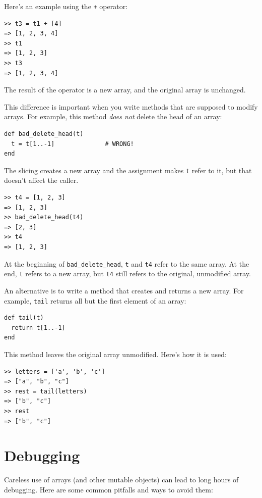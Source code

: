 \documentclass[10pt]{book}
\begin{document}
Here's an example using the {\tt +} operator:
%
\begin{verbatim}
>> t3 = t1 + [4]
=> [1, 2, 3, 4]
>> t1
=> [1, 2, 3]
>> t3
=> [1, 2, 3, 4]
\end{verbatim}
%
The result of the operator is a new array, and the original array is
unchanged.

This difference is important when you write methods that
are supposed to modify arrays.  For example, this method
{\em does not} delete the head of an array:
%
\begin{verbatim}
def bad_delete_head(t)
  t = t[1..-1]              # WRONG!
end
\end{verbatim}
%
The slicing creates a new array and the assignment
makes {\tt t} refer to it, but that doesn't affect the caller.
%
\begin{verbatim}
>> t4 = [1, 2, 3]
=> [1, 2, 3]
>> bad_delete_head(t4)
=> [2, 3]
>> t4
=> [1, 2, 3]
\end{verbatim}
%
At the beginning of \verb"bad_delete_head", {\tt t} and {\tt t4}
refer to the same array.  At the end, {\tt t} refers to a new array,
but {\tt t4} still refers to the original, unmodified array.

An alternative is to write a method that creates and
returns a new array.  For
example, {\tt tail} returns all but the first
element of an array:

\begin{verbatim}
def tail(t)
  return t[1..-1]
end
\end{verbatim}
%
This method leaves the original array unmodified.
Here's how it is used:

\begin{verbatim}
>> letters = ['a', 'b', 'c']
=> ["a", "b", "c"]
>> rest = tail(letters)
=> ["b", "c"]
>> rest
=> ["b", "c"]
\end{verbatim}



\section{Debugging}

Careless use of arrays (and other mutable objects)
can lead to long hours of debugging.  Here are some common
pitfalls and ways to avoid them:
\end{document}
